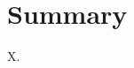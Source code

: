 \documentclass[a4paper, 10 pt, conference]{IEEEtran}
\begin{document}
\section{Summary}

\addtolength{\textheight}{-12cm}  %

\begin{thebibliography}{99}

 X.

\end{thebibliography}
\end{document}
